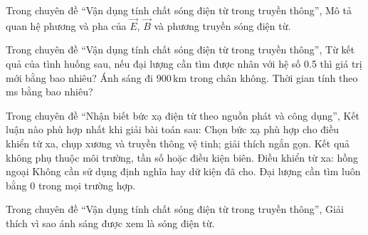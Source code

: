 \begin{bt}
Trong chuyên đề “Vận dụng tính chất sóng điện từ trong truyền thông”, Mô tả quan hệ phương và pha của $\vec E$, $\vec B$ và phương truyền sóng điện từ.
\end{bt}

\begin{ex}
Trong chuyên đề “Vận dụng tính chất sóng điện từ trong truyền thông”, Từ kết quả của tình huống sau, nếu đại lượng cần tìm được nhân với hệ số 0.5 thì giá trị mới bằng bao nhiêu? Ánh sáng đi $900\,\text{km}$ trong chân không. Thời gian tính theo ms bằng bao nhiêu?
\end{ex}

\begin{ex}
Trong chuyên đề “Nhận biết bức xạ điện từ theo nguồn phát và công dụng”, Kết luận nào phù hợp nhất khi giải bài toán sau: Chọn bức xạ phù hợp cho điều khiển từ xa, chụp xương và truyền thông vệ tinh; giải thích ngắn gọn.
\choice
{Kết quả không phụ thuộc môi trường, tần số hoặc điều kiện biên.}
{\True Điều khiển từ xa: hồng ngoại}
{Không cần sử dụng định nghĩa hay dữ kiện đã cho.}
{Đại lượng cần tìm luôn bằng 0 trong mọi trường hợp.}
\end{ex}

\begin{ex}
Trong chuyên đề “Vận dụng tính chất sóng điện từ trong truyền thông”, Giải thích vì sao ánh sáng được xem là sóng điện từ.
\choiceTF

\end{ex}

